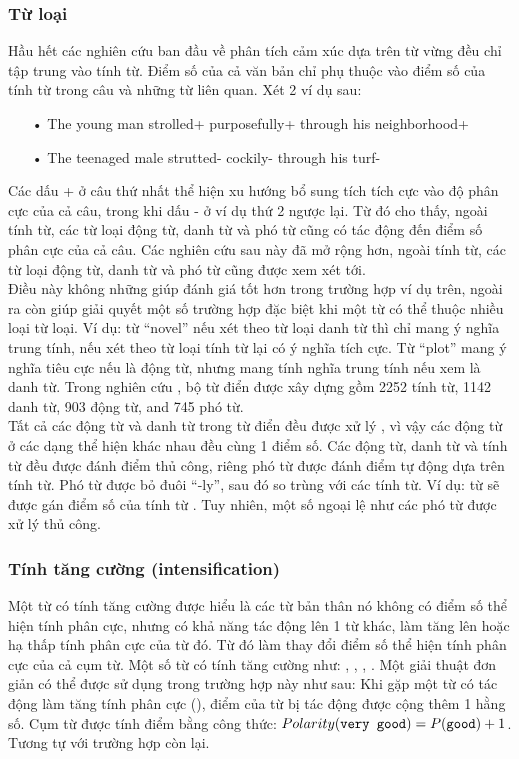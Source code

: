 \subsubsection*{Từ loại}
Hầu hết các nghiên cứu ban đầu về phân tích cảm xúc dựa trên từ vừng đều chỉ tập trung vào tính từ. Điểm số của cả văn bản chỉ phụ thuộc vào điểm số của tính từ trong câu và những từ liên quan. 
Xét 2 ví dụ sau: 
\begin{itemize}
\item[•] The young man strolled+ purposefully+ through his neighborhood+
\item[•] The teenaged male strutted- cockily- through his turf-
\end{itemize}
Các dấu + ở câu thứ nhất thể hiện xu hướng bổ sung tích tích cực vào độ phân cực của cả câu, trong khi dấu - ở ví dụ thứ 2 ngược lại. Từ đó cho thấy, ngoài tính từ, các từ loại động từ, danh từ và phó từ cũng có tác động đến điểm số phân cực của cả câu. Các nghiên cứu sau này đã mở rộng hơn, ngoài tính từ, các từ loại động từ, danh từ và phó từ cũng được xem xét tới. \\

Điều này không những giúp đánh giá tốt hơn trong trường hợp ví dụ trên, ngoài ra còn giúp giải quyết một số trường hợp đặc biệt khi một từ có thể thuộc nhiều loại từ loại. Ví dụ: từ ``novel'' nếu xét theo từ loại danh từ thì chỉ mang ý nghĩa trung tính, nếu xét theo từ loại tính từ lại có ý nghĩa tích cực. Từ ``plot'' mang ý nghĩa tiêu cực nếu là động từ, nhưng mang tính nghĩa trung tính nếu xem là danh từ. Trong nghiên cứu \cite{taboada2011lexicon}, bộ từ điển được xây dựng gồm 2252 tính từ, 1142 danh từ, 903 động từ, and 745 phó từ. \\

Tất cả các động từ và danh từ trong từ điển đều được xử lý , vì vậy các động từ ở các dạng thể hiện khác nhau đều cùng 1 điểm số. Các động từ, danh từ và tính từ đều được đánh điểm thủ công, riêng phó từ được đánh điểm tự động dựa trên tính từ. Phó từ được bỏ đuôi ``-ly'', sau đó so trùng với các tính từ. Ví dụ: từ  sẽ được gán điểm số của tính từ . Tuy nhiên, một số ngoại lệ như các phó từ  được xử lý thủ công. 
\subsubsection*{Tính tăng cường (intensification)}
Một từ có tính tăng cường được hiểu là các từ bản thân nó không có điểm số thể hiện tính phân cực, nhưng có khả năng tác động lên 1 từ khác, làm tăng lên hoặc hạ thấp tính phân cực của từ đó. Từ đó làm thay đổi điểm số thể hiện tính phân cực của cả cụm từ. Một số từ có tính tăng cường như: , , , . Một giải thuật đơn giản có thể được sử dụng trong trường hợp này như sau:
Khi gặp một từ có tác động làm tăng tính phân cực (), điểm của từ bị tác động được cộng thêm 1 hằng số. 
Cụm từ  được tính điểm bằng công thức: $Polarity(\text{{\ttfamily very good}}) = P(\text{{\ttfamily good}}) + 1$.
Tương tự với trường hợp còn lại. \\

